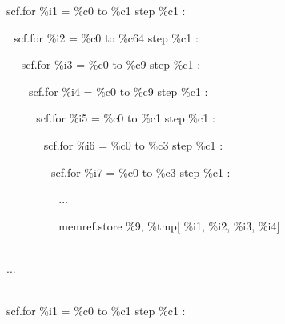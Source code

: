 

{\color{color02} scf.for} {\color{color05} \%i1} = {\color{color05} \%c0} {\color{color06} to} 
{\color{color05} \%c1} {\color{color06} step} {\color{color05} \%c1} :

{\color{color02} \,\,\,\,scf.for} {\color{color05} \%i2} = {\color{color05} \%c0} {\color{color06} to} 
{\color{color05} \%c64} {\color{color06} step} {\color{color05} \%c1} :

{\color{color02} \,\,\,\,\,\,\,\,scf.for} {\color{color05} \%i3} = {\color{color05} \%c0} 
{\color{color06} to} {\color{color05} \%c9} {\color{color06} step} {\color{color05} \%c1} 
:

{\color{color02} \,\,\,\,\,\,\,\,\,\,\,\,scf.for} {\color{color05} \%i4} = {\color{color05} \%c0} 
{\color{color06} to} {\color{color05} \%c9} {\color{color06} step} {\color{color05} \%c1} 
:

{\color{color02} \,\,\,\,\,\,\,\,\,\,\,\,\,\,\,\,scf.for} {\color{color05} \%i5} = {\color{color05} \%c0} 
{\color{color06} to} {\color{color05} \%c1} {\color{color06} step} {\color{color05} \%c1} 
:

{\color{color02} \,\,\,\,\,\,\,\,\,\,\,\,\,\,\,\,\,\,\,\,scf.for} {\color{color05} \%i6} = {\color{color05} \%c0} 
{\color{color06} to} {\color{color05} \%c3} {\color{color06} step} {\color{color05} \%c1} 
:

{\color{color02} \,\,\,\,\,\,\,\,\,\,\,\,\,\,\,\,\,\,\,\,\,\,\,\,scf.for} {\color{color05} \%i7} = {\color{color05} \%c0} 
{\color{color06} to} {\color{color05} \%c3} {\color{color06} step} {\color{color05} \%c1} 
:

\,\,\,\,\,\,\,\,\,\,\,\,\,\,\,\,\,\,\,\,\,\,\,\,\,\,\,\,...

{\color{color02} \,\,\,\,\,\,\,\,\,\,\,\,\,\,\,\,\,\,\,\,\,\,\,\,\,\,\,\,memref.store} {\color{color05} \%9}, 
{\color{color05} \%tmp}[{\color{color05} \%i1}, {\color{color05} \%i2}, {\color{color05} \%i3}, 
{\color{color05} \%i4}]\,

\,\\
...\,\,\,\,\,\,\,\,\,\,\,\,\,\,\,\,\,\,\,\,\,\,\,\,

\,\\
{\color{color02} scf.for} {\color{color05} \%i1} = {\color{color05} \%c0} {\color{color06} to} 
{\color{color05} \%c1} {\color{color06} step} {\color{color05} \%c1} :

